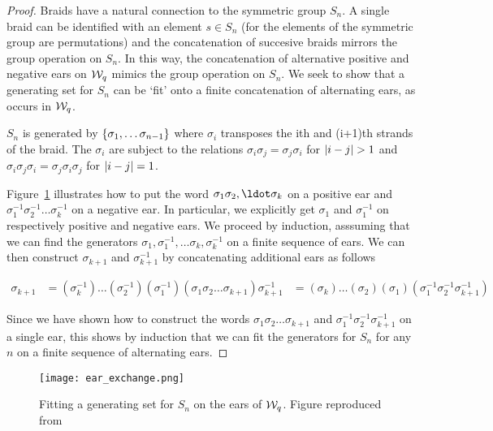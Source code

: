 \documentclass[paper.tex]{subfiles}
\begin{document}
\begin{proof}
  Braids have a natural connection to the symmetric group $S_n$. A single braid can be identified with an element $s \in S_n$ (for the elements of the symmetric group are permutations) and the concatenation of succesive braids
  mirrors the group operation on $S_n$. In this way, the concatenation of alternative positive and negative ears on $\mathcal{W}_q$ mimics the group operation on $S_n$. We seek to show that a generating set for $S_n$ can be `fit' onto a
  finite concatenation of alternating ears, as occurs in $\mathcal{W}_q$.

  $S_n$ is generated by $\{ \sigma_1, \ldots \sigma_{n - 1} \}$ where $\sigma_i$ transposes the ith and (i+1)th strands of the braid. The $\sigma_i$ are subject to the relations $\sigma_i \sigma_j = \sigma_j \sigma_i$
  for $\left| i - j \right| > 1$ and $\sigma_i \sigma_j \sigma_i = \sigma_j \sigma_i \sigma_j$ for $\left| i - j \right| = 1$.

  Figure~\ref{fig:earexchange} illustrates how to put the word $\sigma_1 \sigma_2, \ldot \sigma_k$ on a positive ear and $\sigma_1^{-1} \sigma_2^{-1} \ldots \sigma_k^{-1}$ on a negative ear. In particular, we explicitly get
  $\sigma_1$ and $\sigma_1^{-1}$ on respectively positive and negative ears. We proceed by induction, asssuming that we can find the generators $\sigma_1, \sigma_1^{-1}, \ldots \sigma_k, \sigma_k^{-1}$ on a finite sequence
  of ears. We can then construct $\sigma_{k+1}$ and $\sigma_{k+1}^{-1}$ by concatenating additional ears as follows


  \begin{align}
    \sigma_{k+1} &= (\sigma_k^{-1}) \ldots (\sigma_2^{-1})(\sigma_1^{-1})(\sigma_1 \sigma_2 \ldots \sigma_{k+1})
    \sigma_{k+1}^{-1} &= (\sigma_k) \ldots(\sigma_2) (\sigma_1) (\sigma_1^{-1} \sigma_2^{-1} \sigma_{k+1}^{-1})
  \end{align}

  Since we have shown how to construct the words $\sigma_1 \sigma_2 \ldots \sigma_{k+1}$ and $\sigma_1^{-1} \sigma_2^{-1} \sigma_{k+1}^{-1}$ on a single ear, this shows by induction that we can fit the generators for $S_n$ for
  any $n$ on a finite sequence of alternating ears.

\end{proof}



\begin{figure}[h]
  \centering
  \texttt{[image: ear\_exchange.png]}
  \caption{Fitting a generating set for $S_n$ on the ears of $\mathcal{W}_q$. Figure reproduced from~\cite{Ghrist1996}}\label{fig:earexchange}
\end{figure}
\end{document}
